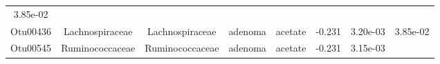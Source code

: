 \documentclass[11pt,]{article}
\begin{document}
\begin{longtable}[]{@{}cccccccc@{}}
\begin{minipage}[t]{0.08\columnwidth}
3.85e-02\strut
\end{minipage}\tabularnewline
\begin{minipage}[t]{0.08\columnwidth}\centering\strut
Otu00436\strut
\end{minipage} & \begin{minipage}[t]{0.15\columnwidth}\centering\strut
Lachnospiraceae\strut
\end{minipage} & \begin{minipage}[t]{0.15\columnwidth}\centering\strut
Lachnospiraceae\strut
\end{minipage} & \begin{minipage}[t]{0.08\columnwidth}\centering\strut
adenoma\strut
\end{minipage} & \begin{minipage}[t]{0.09\columnwidth}\centering\strut
acetate\strut
\end{minipage} & \begin{minipage}[t]{0.07\columnwidth}\centering\strut
-0.231\strut
\end{minipage} & \begin{minipage}[t]{0.08\columnwidth}\centering\strut
3.20e-03\strut
\end{minipage} & \begin{minipage}[t]{0.08\columnwidth}\centering\strut
3.85e-02\strut
\end{minipage}\tabularnewline
\begin{minipage}[t]{0.08\columnwidth}\centering\strut
Otu00545\strut
\end{minipage} & \begin{minipage}[t]{0.15\columnwidth}\centering\strut
Ruminococcaceae\strut
\end{minipage} & \begin{minipage}[t]{0.15\columnwidth}\centering\strut
Ruminococcaceae\strut
\end{minipage} & \begin{minipage}[t]{0.08\columnwidth}\centering\strut
adenoma\strut
\end{minipage} & \begin{minipage}[t]{0.09\columnwidth}\centering\strut
acetate\strut
\end{minipage} & \begin{minipage}[t]{0.07\columnwidth}\centering\strut
-0.231\strut
\end{minipage} & \begin{minipage}[t]{0.08\columnwidth}\centering\strut
3.15e-03\strut
\end{minipage} & \begin{minipage}[t]{0.08\columnwidth}\centering\strut

\end{minipage}
\end{longtable}
\end{document}
